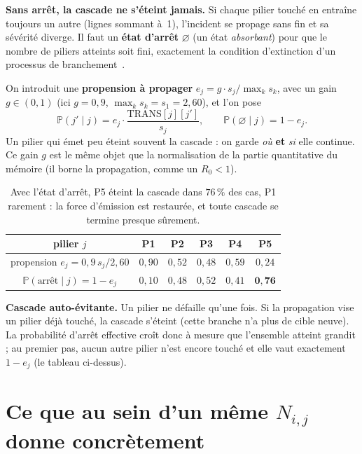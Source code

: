 \documentclass[11pt,a4paper]{article}
\begin{document}
\begin{attention}
\textbf{Sans arrêt, la cascade ne s'éteint jamais.} Si chaque pilier touché en entraîne toujours
un autre (lignes sommant à~1), l'incident se propage sans fin et sa sévérité diverge. Il faut un
\textbf{état d'arrêt} $\varnothing$ (un état \emph{absorbant}) pour que le nombre de piliers
atteints soit fini, exactement la condition d'extinction d'un processus de
branchement~\cite{AthreyaNey1972}.
\end{attention}

\noindent On introduit une \textbf{propension à propager} $e_j = g\cdot s_j / \max_k s_k$, avec un
gain $g\in(0,1)$ (ici $g=0{,}9$, $\max_k s_k = s_1 = 2{,}60$), et l'on pose
\begin{equation}
\mathbb P(j' \mid j) = e_j \cdot \frac{\text{TRANS}[j][j']}{s_j},
\qquad
\mathbb P(\varnothing \mid j) = 1 - e_j.
\end{equation}
Un pilier qui émet peu éteint souvent la cascade : on garde \emph{où} \textbf{et} \emph{si} elle
continue. Ce gain $g$ est le même objet que la normalisation de la partie quantitative du
mémoire (il borne la propagation, comme un $R_0<1$).

\begin{table}[h]\centering\small
\renewcommand{\arraystretch}{1.25}
\begin{tabular}{@{}cccccc@{}}
\toprule
pilier $j$ & P1 & P2 & P3 & P4 & P5 \\
\midrule
propension $e_j = 0{,}9\,s_j/2{,}60$ & $0{,}90$ & $0{,}52$ & $0{,}48$ & $0{,}59$ & $0{,}24$ \\
$\mathbb P(\text{arrêt}\mid j) = 1-e_j$ & $0{,}10$ & $0{,}48$ & $0{,}52$ & $0{,}41$ & $\mathbf{0{,}76}$ \\
\bottomrule
\end{tabular}
\caption{Avec l'état d'arrêt, P5 éteint la cascade dans $76\,\%$ des cas, P1 rarement : la force
d'émission est restaurée, et toute cascade se termine presque sûrement.}
\end{table}

\noindent\textbf{Cascade auto-évitante.} Un pilier ne défaille qu'une fois. Si la propagation
vise un pilier déjà touché, la cascade s'éteint (cette branche n'a plus de cible neuve). La
probabilité d'arrêt effective croît donc à mesure que l'ensemble atteint grandit ; au premier
pas, aucun autre pilier n'est encore touché et elle vaut exactement $1-e_j$ (le tableau ci-dessus).

\section{Ce que \og{}au sein d'un même $N_{i,j}$\fg{} donne concrètement}
\end{document}
